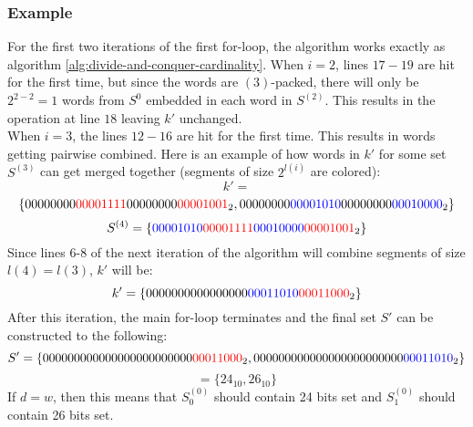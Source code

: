 \subsubsection{Example}
For the first two iterations of the first for-loop, the algorithm works exactly as algorithm \ref{alg:divide-and-conquer-cardinality}. When $i=2$, lines $17-19$ are hit for the first time, but since the words are $(3)$-packed, there will only be $2^{2-2}=1$ words from $S^{0}$ embedded in each word in $S^{(2)}$. This results in the operation at line $18$ leaving $k'$ unchanged.\\
When $i=3$, the lines $12-16$ are hit for the first time. This results in words getting pairwise combined. Here is an example of how words in $k'$ for some set $S^{(3)}$ can get merged together (segments of size $2^{l(i)}$ are colored):
$$k'=$$
$$\{00000000 \color{red}00001111 \color{black}00000000 \color{red}00001001\color{black}_2, \color{black}0000 0000 \color{blue}0000 1010\color{black}00000000\color{blue}00010000\color{black}_2\}$$
$$S^{(4)}=\{\color{blue}00001010\color{red}00001111\color{blue}0001 0000 \color{red}0000 1001\color{black}_2\}$$
Since lines 6-8 of the next iteration of the algorithm will combine segments of size $l(4) = l(3)$, $k'$ will be:
$$k'=\{\color{black}0000000000000000\color{blue}0001 1010 \color{red}0001 1000\color{black}_2\}$$
After this iteration, the main for-loop terminates and the final set $S'$ can be constructed to the following:
$$S'=\{0000000000000000 00000000 \color{red}00011000\color{black}_2, 0000000000000000 0000 0000 \color{blue} 0001 1010\color{black}_2\}$$
$$=\{ 24_{10}, 26_{10} \}$$
If $d=w$, then this means that $S^{(0)}_0$ should contain 24 bits set and $S^{(0)}_1$ should contain 26 bits set.
